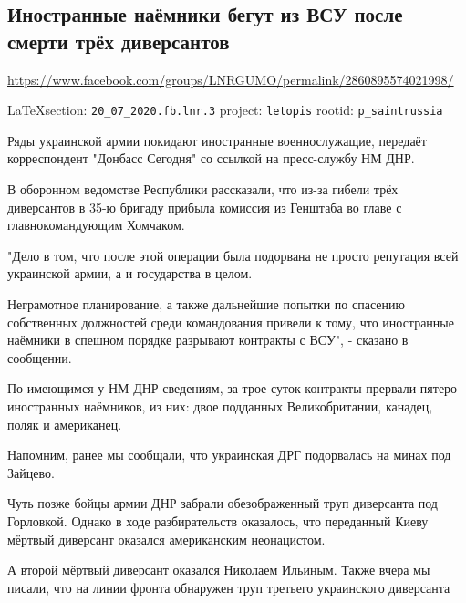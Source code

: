  
 
\subsection{Иностранные наёмники бегут из ВСУ после смерти трёх диверсантов}
\url{https://www.facebook.com/groups/LNRGUMO/permalink/2860895574021998/}
  
\vspace{0.5cm}
{\small\LaTeX section: \verb|20_07_2020.fb.lnr.3| project: \verb|letopis| rootid: \verb|p_saintrussia|}
\vspace{0.5cm}

Ряды украинской армии покидают иностранные военнослужащие, передаёт
корреспондент "Донбасс Сегодня" со ссылкой на пресс-службу НМ ДНР.

В оборонном ведомстве Республики рассказали, что из-за гибели трёх диверсантов
в 35-ю бригаду прибыла комиссия из Генштаба во главе с главнокомандующим
Хомчаком.

"Дело в том, что после этой операции была подорвана не просто репутация всей
украинской армии, а и государства в целом.

Неграмотное планирование, а также дальнейшие попытки по спасению собственных
должностей среди командования привели к тому, что иностранные наёмники в
спешном порядке разрывают контракты с ВСУ", - сказано в сообщении.

По имеющимся у НМ ДНР сведениям, за трое суток контракты прервали пятеро
иностранных наёмников, из них: двое подданных Великобритании, канадец, поляк и
американец.

Напомним, ранее мы сообщали, что украинская ДРГ подорвалась на минах под
Зайцево.

Чуть позже бойцы армии ДНР забрали обезображенный труп диверсанта под
Горловкой.  Однако в ходе разбирательств оказалось, что переданный Киеву
мёртвый диверсант оказался американским неонацистом.

А второй мёртвый диверсант оказался Николаем Ильиным.  Также вчера мы писали,
что на линии фронта обнаружен труп третьего украинского диверсанта
  
